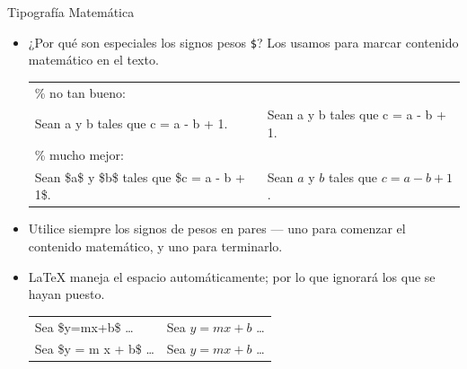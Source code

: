 \documentclass[12pt]{beamer}
\begin{document}
\begin{frame}{Tipografía Matemática}
   \footnotesize{
     \begin{itemize}
     \item<1-> ¿Por qué son especiales los signos pesos \texttt{\color{blue}\$}? Los usamos para marcar contenido  matemático en el texto.\\[1ex]    
     \begin{tabular}{|p{5cm}|p{5cm}|}\hline
 \color{green}\% no tan bueno: & \\
 Sean a y b tales que c = a - b + 1.&Sean a y b tales que c = a - b + 1.\\
 \color{green}\% mucho mejor: & \\
 Sean \$a\$ y \$b\$ tales que \$c = a - b + 1\$. &
 Sean $a$ y $b$ tales que $c = a - b + 1$.\\\hline
     \end{tabular}
   \item<2-> Utilice siempre los signos de pesos en pares --- uno para comenzar el contenido matemático, y uno para terminarlo.
   \item<3-> \LaTeX{} maneja el espacio automáticamente; por lo que ignorará los que se hayan puesto.\\[1ex]
     \begin{center}    
     \begin{tabular}{|l|l|}\hline
 Sea \$y=mx+b\$ \ldots & Sea $y=mx+b$ \ldots\\[5pt]      
 Sea \$y = m x + b\$ \ldots & Sea $y = m x + b$ \ldots\\\hline
     \end{tabular}
     \end{center}
\end{itemize}
}   
\end{frame}
\end{document}
